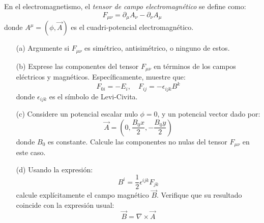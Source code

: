 
\question[2] 
En el electromagnetismo, el \textit{tensor de campo electromagnético} se define como:
\[
F_{\mu\nu} = \partial_\mu A_\nu - \partial_\nu A_\mu
\]
donde \( A^\mu = (\phi, \vec{A}) \) es el cuadri-potencial electromagnético.

\begin{itemize}
  \item[(a)] Argumente si \( F_{\mu\nu} \) es simétrico, antisimétrico, o
    ninguno de estos.

  \item[(b)] Exprese las componentes del tensor \( F_{\mu\nu} \) en términos de
    los campos eléctricos y magnéticos. Específicamente, muestre que:
  \[
  F_{0i} = -E_i, \quad F_{ij} = -\epsilon_{ijk} B^k
  \]
   donde $\epsilon_{ijk}$ es el símbolo de Levi-Civita.

  \item[(c)] Considere un potencial escalar nulo \( \phi = 0 \), y un potencial vector dado por:
  \[
  \vec{A} = \left(0, \frac{B_0 x}{2}, -\frac{B_0 y}{2} \right)
  \]
  donde \( B_0 \) es constante. Calcule las componentes no nulas del tensor \( F_{\mu\nu} \) en este caso.

  \item[(d)] Usando la expresión:
  \[
  B^i = \frac{1}{2} \epsilon^{ijk} F_{jk}
  \]
  calcule explícitamente el campo magnético \( \vec{B} \). Verifique que su
  resultado coincide con la expresión usual:
  \[
  \vec{B} = \nabla \times \vec{A}
  \]
\end{itemize}


\droptotalpoints
